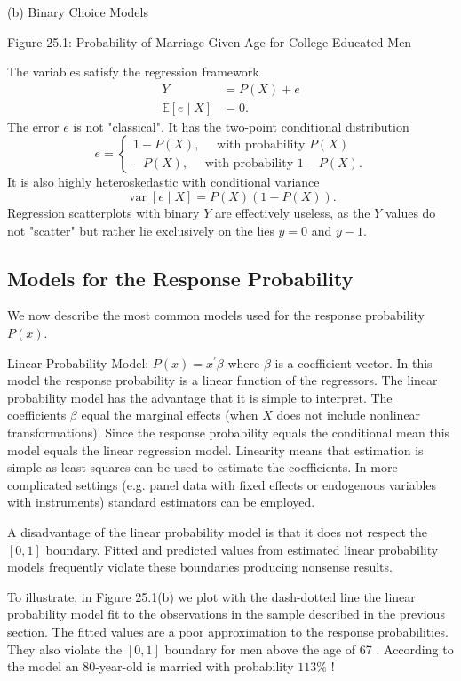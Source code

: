 \documentclass[10pt]{article}
\begin{document}
(b) Binary Choice Models

Figure 25.1: Probability of Marriage Given Age for College Educated Men

The variables satisfy the regression framework
$$
\begin{aligned}
Y &=P(X)+e \\
\mathbb{E}[e \mid X] &=0 .
\end{aligned}
$$
The error $e$ is not "classical". It has the two-point conditional distribution
$$
e=\left\{\begin{array}{c}
1-P(X), \quad \text { with probability } P(X) \\
-P(X), \quad \text { with probability } 1-P(X) .
\end{array}\right.
$$
It is also highly heteroskedastic with conditional variance
$$
\operatorname{var}[e \mid X]=P(X)(1-P(X)) .
$$
Regression scatterplots with binary $Y$ are effectively useless, as the $Y$ values do not "scatter" but rather lie exclusively on the lies $y=0$ and $y-1$.

\subsection{Models for the Response Probability}
We now describe the most common models used for the response probability $P(x)$.

Linear Probability Model: $P(x)=x^{\prime} \beta$ where $\beta$ is a coefficient vector. In this model the response probability is a linear function of the regressors. The linear probability model has the advantage that it is simple to interpret. The coefficients $\beta$ equal the marginal effects (when $X$ does not include nonlinear transformations). Since the response probability equals the conditional mean this model equals the linear regression model. Linearity means that estimation is simple as least squares can be used to estimate the coefficients. In more complicated settings (e.g. panel data with fixed effects or endogenous variables with instruments) standard estimators can be employed.

A disadvantage of the linear probability model is that it does not respect the $[0,1]$ boundary. Fitted and predicted values from estimated linear probability models frequently violate these boundaries producing nonsense results.

To illustrate, in Figure 25.1(b) we plot with the dash-dotted line the linear probability model fit to the observations in the sample described in the previous section. The fitted values are a poor approximation to the response probabilities. They also violate the $[0,1]$ boundary for men above the age of 67 . According to the model an 80-year-old is married with probability $113 \%$ !
\end{document}

